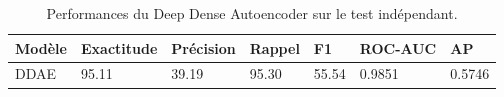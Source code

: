 \begin{table}
\caption{Performances du Deep Dense Autoencoder sur le test indépendant.}
\label{tab:performances_ddae_finales}
\begin{tabular}{lllllll}
\toprule
Modèle & Exactitude & Précision & Rappel & F1 & ROC-AUC & AP \\
\midrule
DDAE & 95.11 & 39.19 & 95.30 & 55.54 & 0.9851 & 0.5746 \\
\bottomrule
\end{tabular}
\end{table}
